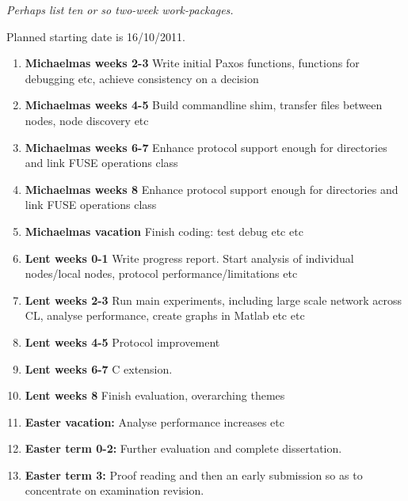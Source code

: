 {\em Perhaps list ten or so two-week work-packages.}

Planned starting date is 16/10/2011.

\begin{enumerate}

\item {\bf Michaelmas weeks 2-3} Write initial Paxos functions, functions for debugging etc,
achieve consistency on a decision

\item {\bf Michaelmas weeks 4-5} Build commandline shim, transfer files between nodes, node
discovery etc

\item {\bf Michaelmas weeks 6-7} Enhance protocol support enough for directories and link FUSE
operations class

\item {\bf Michaelmas weeks 8} Enhance protocol support enough for directories and link FUSE
operations class

\item {\bf Michaelmas vacation} Finish coding: test debug etc etc

\item {\bf Lent weeks 0-1} Write progress report. Start analysis of individual nodes/local nodes,
protocol performance/limitations etc

\item {\bf Lent weeks 2-3} Run main experiments, including large scale network across CL, analyse
performance, create graphs in Matlab etc etc

\item {\bf Lent weeks 4-5} Protocol improvement

\item {\bf Lent weeks 6-7} C extension.

\item {\bf Lent weeks 8} Finish evaluation, overarching themes

\item {\bf Easter vacation:} Analyse performance increases etc

\item {\bf Easter term 0-2:}  Further evaluation and complete dissertation.

\item {\bf Easter term 3:} Proof reading and then an early submission so as to concentrate on examination revision.

\end{enumerate}
